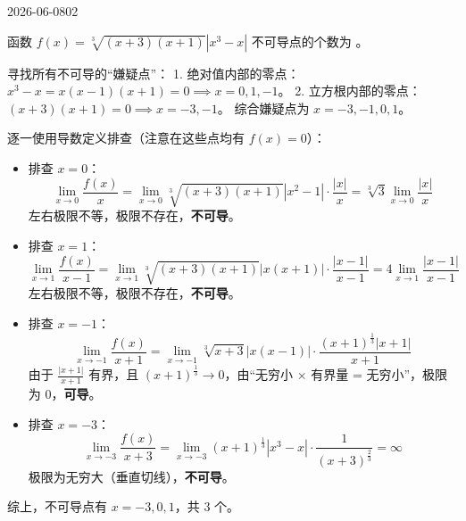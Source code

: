 \begin{mistake}{2026-06-08}{02}

\begin{problemcontent}
函数 \(f(x) = \sqrt[3]{(x+3)(x+1)} |x^3 - x|\) 不可导点的个数为 \underline{\hspace{1cm}}。
\end{problemcontent}

\begin{solutioncontent}
寻找所有不可导的“嫌疑点”：
1. 绝对值内部的零点：\(x^3 - x = x(x-1)(x+1) = 0 \implies x = 0, 1, -1\)。
2. 立方根内部的零点：\((x+3)(x+1) = 0 \implies x = -3, -1\)。
综合嫌疑点为 \(x = -3, -1, 0, 1\)。

逐一使用导数定义排查（注意在这些点均有 \(f(x)=0\)）：
\begin{itemize}
    \item 排查 \(x = 0\)：
    \[ \lim_{x \to 0} \frac{f(x)}{x} = \lim_{x \to 0} \sqrt[3]{(x+3)(x+1)} |x^2-1| \cdot \frac{|x|}{x} = \sqrt[3]{3} \lim_{x \to 0} \frac{|x|}{x} \]
    左右极限不等，极限不存在，\textbf{不可导}。
    
    \item 排查 \(x = 1\)：
    \[ \lim_{x \to 1} \frac{f(x)}{x-1} = \lim_{x \to 1} \sqrt[3]{(x+3)(x+1)} |x(x+1)| \cdot \frac{|x-1|}{x-1} = 4 \lim_{x \to 1} \frac{|x-1|}{x-1} \]
    左右极限不等，极限不存在，\textbf{不可导}。
    
    \item 排查 \(x = -1\)：
    \[ \lim_{x \to -1} \frac{f(x)}{x+1} = \lim_{x \to -1} \sqrt[3]{x+3} |x(x-1)| \cdot \frac{(x+1)^{\frac{1}{3}}|x+1|}{x+1} \]
    由于 \(\frac{|x+1|}{x+1}\) 有界，且 \((x+1)^{\frac{1}{3}} \to 0\)，由“无穷小 \(\times\) 有界量 = 无穷小”，极限为 \(0\)，\textbf{可导}。
    
    \item 排查 \(x = -3\)：
    \[ \lim_{x \to -3} \frac{f(x)}{x+3} = \lim_{x \to -3} (x+1)^{\frac{1}{3}}|x^3-x| \cdot \frac{1}{(x+3)^{\frac{2}{3}}} = \infty \]
    极限为无穷大（垂直切线），\textbf{不可导}。
\end{itemize}
综上，不可导点有 \(x = -3, 0, 1\)，共 3 个。
\end{solutioncontent}


\end{mistake}
